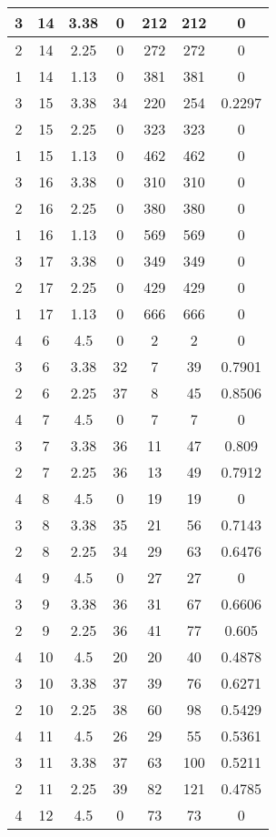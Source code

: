 \documentclass[letterpaper, 12pt]{article}
\begin{document}
\begin{longtable}{|c|c|c|c|c|c|c|}
\hline
3 & 14 & 3.38 & 0 & 212 & 212 & 0 \\
\hline
2 & 14 & 2.25 & 0 & 272 & 272 & 0 \\
\hline
1 & 14 & 1.13 & 0 & 381 & 381 & 0 \\
\hline
3 & 15 & 3.38 & 34 & 220 & 254 & 0.2297 \\
\hline
2 & 15 & 2.25 & 0 & 323 & 323 & 0 \\
\hline
1 & 15 & 1.13 & 0 & 462 & 462 & 0 \\
\hline
3 & 16 & 3.38 & 0 & 310 & 310 & 0 \\
\hline
2 & 16 & 2.25 & 0 & 380 & 380 & 0 \\
\hline
1 & 16 & 1.13 & 0 & 569 & 569 & 0 \\
\hline
3 & 17 & 3.38 & 0 & 349 & 349 & 0 \\
\hline
2 & 17 & 2.25 & 0 & 429 & 429 & 0 \\
\hline
1 & 17 & 1.13 & 0 & 666 & 666 & 0 \\
\hline
4 & 6 & 4.5 & 0 & 2 & 2 & 0 \\
\hline
3 & 6 & 3.38 & 32 & 7 & 39 & 0.7901 \\
\hline
2 & 6 & 2.25 & 37 & 8 & 45 & 0.8506 \\
\hline
4 & 7 & 4.5 & 0 & 7 & 7 & 0 \\
\hline
3 & 7 & 3.38 & 36 & 11 & 47 & 0.809 \\
\hline
2 & 7 & 2.25 & 36 & 13 & 49 & 0.7912 \\
\hline
4 & 8 & 4.5 & 0 & 19 & 19 & 0 \\
\hline
3 & 8 & 3.38 & 35 & 21 & 56 & 0.7143 \\
\hline
2 & 8 & 2.25 & 34 & 29 & 63 & 0.6476 \\
\hline
4 & 9 & 4.5 & 0 & 27 & 27 & 0 \\
\hline
3 & 9 & 3.38 & 36 & 31 & 67 & 0.6606 \\
\hline
2 & 9 & 2.25 & 36 & 41 & 77 & 0.605 \\
\hline
4 & 10 & 4.5 & 20 & 20 & 40 & 0.4878 \\
\hline
3 & 10 & 3.38 & 37 & 39 & 76 & 0.6271 \\
\hline
2 & 10 & 2.25 & 38 & 60 & 98 & 0.5429 \\
\hline
4 & 11 & 4.5 & 26 & 29 & 55 & 0.5361 \\
\hline
3 & 11 & 3.38 & 37 & 63 & 100 & 0.5211 \\
\hline
2 & 11 & 2.25 & 39 & 82 & 121 & 0.4785 \\
\hline
4 & 12 & 4.5 & 0 & 73 & 73 & 0 \\

\end{longtable}
\end{document}
